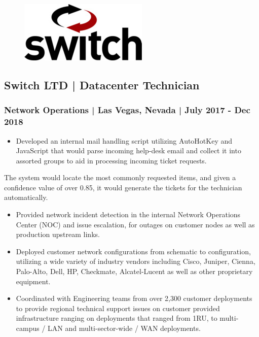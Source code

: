 \documentclass[letter,10pt]{article}
\begin{document}
\begin{figure}
\includegraphics[width=0.8\linewidth]{./img/50p_cr_switch.jpg}
\end{figure}

\subsection*{Switch LTD | Datacenter Technician}
\label{sec:orgbf0a3a6}
\subsubsection*{Network Operations | Las Vegas, Nevada | July 2017 - Dec 2018}
\label{sec:org9bb2fd2}
\begin{itemize}
\item Developed an internal mail handling script utilizing AutoHotKey and JavaScript that would parse incoming help-desk email and collect it into assorted groups to aid in processing incoming ticket requests.
\end{itemize}
The system would locate the most commonly requested items, and given a confidence value of over 0.85, it would generate the tickets for the technician automatically. 
\begin{itemize}
\item Provided network incident detection in the internal Network Operations Center (NOC) and issue escalation, for outages on customer nodes as well as production upstream links.
\item Deployed customer network configurations from schematic to configuration, utilizing a wide variety of industry vendors including Cisco, Juniper, Cienna, Palo-Alto, Dell, HP, Checkmate, Alcatel-Lucent as well as other proprietary equipment.
\item Coordinated with Engineering teams from over 2,300 customer deployments to provide regional technical support issues on customer provided infrastructure ranging on deployments that ranged from 1RU, to multi-campus / LAN and multi-sector-wide / WAN deployments.
\end{itemize}
\end{document}
